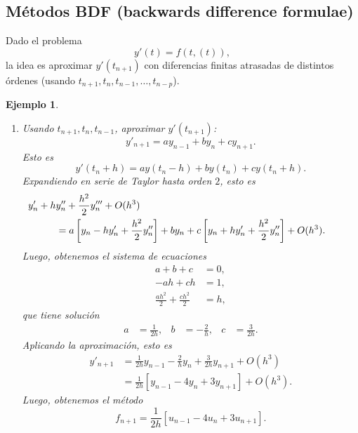 \documentclass[11pt,letterpaper]{report}
\newtheorem{example}{Ejemplo}
\begin{document}
\subsection{Métodos BDF (backwards difference formulae)}

Dado el problema
\begin{equation}
  y'(t)=f(t,(t))
,\end{equation}
la idea es aproximar $y'(t_{n+1})$ con diferencias finitas atrasadas
de distintos órdenes (usando $t_{n+1},t_{n},t_{n-1},\dots,t_{n-p}$).

\begin{example}
  \begin{enumerate}
    \item
      Usando $t_{n+1},t_{n},t_{n-1}$, aproximar $y'(t_{n+1})$:
      \begin{equation}
        y'_{n+1} = ay_{n-1} + by_{n} + cy_{n+1}
      .\end{equation}
      Esto es
      \begin{equation}
        y'(t_{n}+h)
        = ay(t_{n}-h) + by(t_{n}) + cy(t_n+h)
      .\end{equation}
      Expandiendo en serie de Taylor hasta orden $2$, esto es
      \begin{align}
        &\hspace{-10mm}
        y'_n + hy''_n + \frac{h^{2}}{2}y'''_n + O(h^{3}) \\
        &= a \left[y_n - h y'_n + \frac{h^{2}}{2}y''_n\right]
        + b y_n
        + c \left[y_n + hy'_n + \frac{h^{2}}{2}y''_n\right]
        + O(h^{3})
      .\end{align}
      Luego, obtenemos el sistema de ecuaciones
      \begin{align}
        a+b+c &= 0, \\
        -ah+ch &= 1, \\
        \frac{ah^{2}}{2} + \frac{ch^{2}}{2} &= h,
      \end{align}
      que tiene solución
      \begin{align}
        a &= \frac{1}{2h}, &
        b &= -\frac{2}{h}, &
        c &= \frac{3}{2h}.
      \end{align}
      Aplicando la aproximación, esto es
      \begin{align}
        y'_{n+1}
        &= \frac{1}{2h}y_{n-1} - \frac{2}{h}y_n + \frac{3}{2h}y_{n+1}
        + O(h^{3})
        \\
        &= \frac{1}{2h}[y_{n-1} - 4y_n + 3y_{n+1}] + O(h^{3})
      .\end{align}
      Luego, obtenemos el método
      \begin{equation}
        f_{n+1} = \frac{1}{2h}[u_{n-1} - 4u_n + 3u_{n+1}]
      .\end{equation}
  \end{enumerate}
\end{example}
\end{document}
